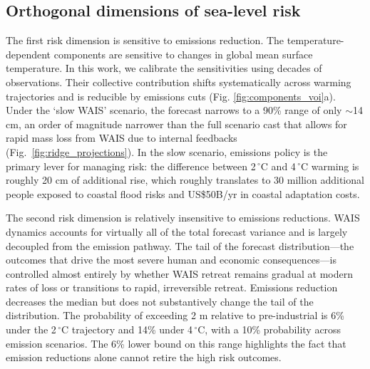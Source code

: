 \documentclass[12pt]{article}
\begin{document}
\subsection*{Orthogonal dimensions of sea-level risk}

The first risk dimension is sensitive to emissions reduction. The temperature-dependent components are sensitive to changes in global mean surface temperature. In this work, we calibrate the sensitivities using decades of observations. Their collective contribution shifts systematically across warming trajectories and is reducible by emissions cuts (Fig. \ref{fig:components_voi}a). Under the `slow WAIS' scenario, the forecast narrows to a 90\% range of only $\sim$14 cm, an order of magnitude narrower than the full scenario cast that allows for rapid mass loss from WAIS due to internal feedbacks (Fig.~\ref{fig:ridge_projections}). In the slow scenario, emissions policy is the primary lever for managing risk: the difference between 2$\,^\circ$C and 4$\,^\circ$C warming is roughly 20 cm of additional rise, which roughly translates to 30 million additional people exposed to coastal flood risks and US\$50B/yr in coastal adaptation costs.

The second risk dimension is relatively insensitive to emissions reductions. WAIS dynamics accounts for virtually all of the total forecast variance and is largely decoupled from the emission pathway. The tail of the forecast distribution---the outcomes that drive the most severe human and economic consequences---is controlled almost entirely by whether WAIS retreat remains gradual at modern rates of loss or transitions to rapid, irreversible retreat. Emissions reduction decreases the median but does not substantively change the tail of the distribution. The probability of exceeding 2 m relative to pre-industrial is 6\% under the 2$\,^\circ$C trajectory and 14\% under 4$\,^\circ$C, with a 10\% probability across emission scenarios. The 6\% lower bound on this range highlights the fact that emission reductions alone cannot retire the high risk outcomes.
\end{document}
